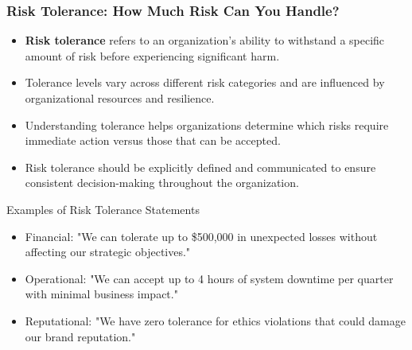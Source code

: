 \documentclass{beamer}
\begin{document}
        \begin{frame}
        \frametitle{Risk Tolerance: How Much Risk Can You Handle?}
        \begin{itemize}
          \item \textbf{Risk tolerance} refers to an organization's ability to withstand a specific amount of risk before experiencing significant harm.
          \item Tolerance levels vary across different risk categories and are influenced by organizational resources and resilience.
          \item Understanding tolerance helps organizations determine which risks require immediate action versus those that can be accepted.
          \item Risk tolerance should be explicitly defined and communicated to ensure consistent decision-making throughout the organization.
        \end{itemize}
        
        \begin{exampleblock}{Examples of Risk Tolerance Statements}
        \begin{itemize}
          \item Financial: "We can tolerate up to \$500,000 in unexpected losses without affecting our strategic objectives."
          \item Operational: "We can accept up to 4 hours of system downtime per quarter with minimal business impact."
          \item Reputational: "We have zero tolerance for ethics violations that could damage our brand reputation."
        \end{itemize}
        \end{exampleblock}
        \end{frame}
        
\end{document}
